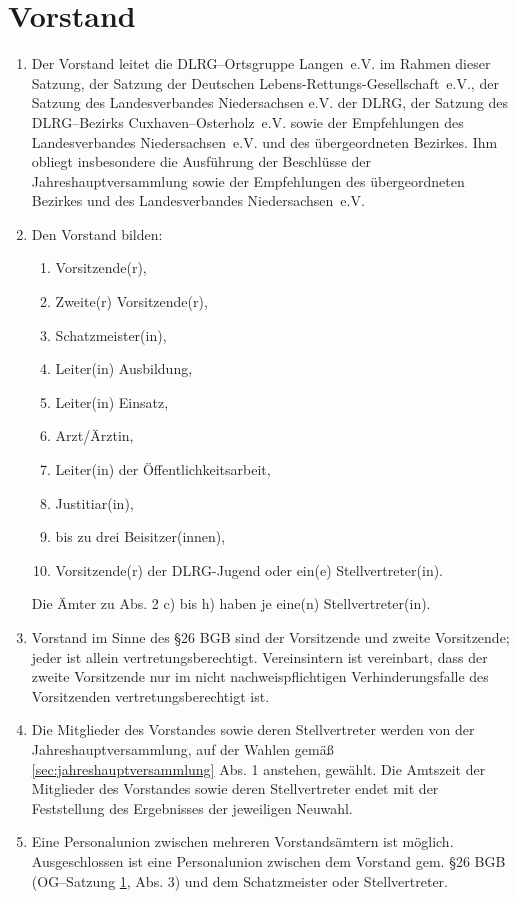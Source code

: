 \documentclass[%
12pt, %
a4paper, %
headsepline, %
parskip, %
headings=normal, %
]{scrreprt}
\begin{document}
\section{Vorstand}
\label{sec:vorstand}
\begin{enumerate}
    \item Der Vorstand leitet die DLRG--Ortsgruppe Langen~e.V. im Rahmen dieser Satzung, der Satzung der Deutschen Lebens-Rettungs-Gesellschaft~e.V., der Satzung des Landesverbandes Niedersachsen e.V. der DLRG, der Satzung des DLRG--Bezirks Cuxhaven--Osterholz~e.V. sowie der Empfehlungen des Landesverbandes Niedersachsen~e.V. und des übergeordneten Bezirkes. Ihm obliegt insbesondere die Ausführung der Beschlüsse der Jahreshauptversammlung sowie der Empfehlungen des übergeordneten Bezirkes und des Landesverbandes Niedersachsen~e.V.
    \item Den Vorstand bilden:\begin{enumerate}[noitemsep]
        \item Vorsitzende(r),
        \item Zweite(r) Vorsitzende(r),
        \item Schatzmeister(in),
        \item Leiter(in) Ausbildung,
        \item Leiter(in) Einsatz,
        \item Arzt/Ärztin,
        \item Leiter(in) der Öffentlichkeitsarbeit,
        \item Justitiar(in),
        \item bis zu drei Beisitzer(innen),
        \item Vorsitzende(r) der DLRG-Jugend oder ein(e) Stellvertreter(in).
    \end{enumerate}
    Die Ämter zu Abs. 2 c) bis h) haben je eine(n) Stellvertreter(in).
    \item Vorstand im Sinne des \S 26 BGB sind der Vorsitzende und zweite Vorsitzende; jeder ist allein vertretungsberechtigt. Vereinsintern ist vereinbart, dass der zweite Vorsitzende nur im nicht nachweispflichtigen Verhinderungsfalle des Vorsitzenden vertretungsberechtigt ist.
    \item Die Mitglieder des Vorstandes sowie deren Stellvertreter werden von der Jahreshauptversammlung, auf der Wahlen gemäß \ref{sec:jahreshauptversammlung} Abs. 1 anstehen, gewählt. Die Amtszeit der Mitglieder des Vorstandes sowie deren Stellvertreter endet mit der Feststellung des Ergebnisses der jeweiligen Neuwahl.
    \item Eine Personalunion zwischen mehreren Vorstandsämtern ist möglich. Ausgeschlossen ist eine Personalunion zwischen dem Vorstand gem. \S 26 BGB (OG--Satzung \ref{sec:vorstand}, Abs. 3) und dem Schatzmeister oder Stellvertreter.

\end{enumerate}
\end{document}
